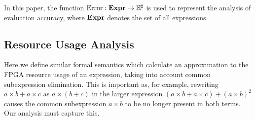 In this paper, the function $\operatorname{\mathrm{Error}}: \mathbf{Expr}\to\mathbb{E}^\sharp$ is used to represent
the analysis of evaluation accuracy, where $\mathbf{Expr}$ denotes the set of all
expressions.

\subsection{Resource Usage Analysis}

Here we define similar formal semantics which calculate an approximation to the
FPGA resource usage of an expression, taking into account common subexpression
elimination. This is important as, for example, rewriting $a \times b + a
\times c$ as $a \times (b + c)$ in the larger expression $(a \times b + a
\times c) + {(a \times b)}^2$ causes the common subexpression $a \times b$ to
be no longer present in both terms. Our analysis must capture this.

